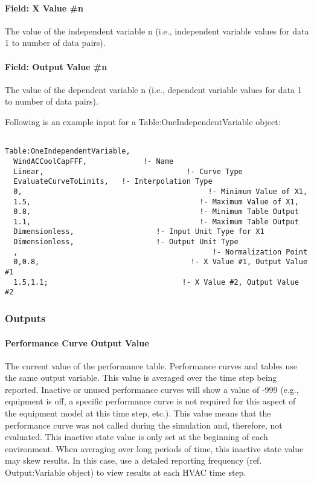 \paragraph{Field: X Value \#n}\label{field-x-value-n}

The value of the independent variable n (i.e., independent variable values for data 1 to number of data pairs).

\paragraph{Field: Output Value \#n}\label{field-output-value-n}

The value of the dependent variable n (i.e., dependent variable values for data 1 to number of data pairs).

Following is an example input for a Table:OneIndependentVariable object:

\begin{lstlisting}

Table:OneIndependentVariable,
  WindACCoolCapFFF,             !- Name
  Linear,                                 !- Curve Type
  EvaluateCurveToLimits,   !- Interpolation Type
  0,                                           !- Minimum Value of X1,
  1.5,                                       !- Maximum Value of X1,
  0.8,                                       !- Minimum Table Output
  1.1,                                       !- Maximum Table Output
  Dimensionless,                   !- Input Unit Type for X1
  Dimensionless,                   !- Output Unit Type
  ,                                             !- Normalization Point
  0,0.8,                                   !- X Value #1, Output Value #1
  1.5,1.1;                               !- X Value #2, Output Value #2
\end{lstlisting}

\subsubsection{Outputs}\label{outputs-022}

\paragraph{\texorpdfstring{Performance Curve Output Value \protect\hyperlink{section-1}{}}{Performance Curve Output Value }}\label{performance-curve-output-value-000}

The current value of the performance table. Performance curves and tables use the same output variable. This value is averaged over the time step being reported. Inactive or unused performance curves will show a value of -999 (e.g., equipment is off, a specific performance curve is not required for this aspect of the equipment model at this time step, etc.). This value means that the performance curve was not called during the simulation and, therefore, not evaluated. This inactive state value is only set at the beginning of each environment. When averaging over long periods of time, this inactive state value may skew results. In this case, use a detaled reporting frequency (ref. Output:Variable object) to view results at each HVAC time step.

